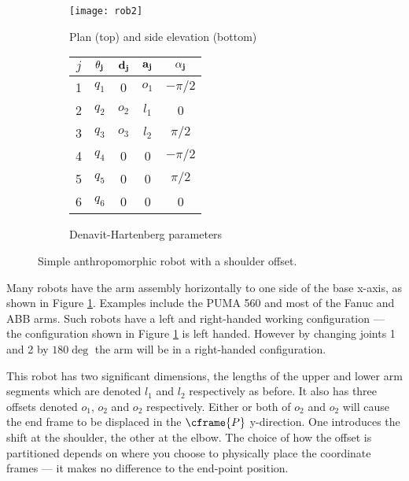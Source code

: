 \documentclass[11pt]{article}
\numberwithin{equation}{section}
\begin{document}
	\begin{figure}[h]
	\centering
	\begin{subfigure}[b]{0.6\textwidth}
		\texttt{[image: rob2]}
		\caption{Plan (top) and side elevation (bottom)}
		\label{fig:rob2}
	\end{subfigure}
	\begin{subfigure}[b]{0.3\textwidth}
		\begin{tabular}{|c|c|c|c|c|} \hline
			$j$ & $\bf \theta_j$ & $\bf d_j$ & $\bf a_j$ & $\bf \alpha_j$ \\ \hline
			\rowcolor{SkyBlue}1 &  $q_1$ & \cellcolor{White} 0 &  $o_1$& $-\pi/2$ \\
			\rowcolor{SkyBlue}2 & $q_2$ & $o_2$ & $l_1$& 0 \\
			\rowcolor{SkyBlue}3 &  $q_3$ & $o_3$ &$l_2$  & $\pi/2$ \\
			\rowcolor{Peach}4 & $q_4$ & 0 & 0 & $-\pi/2$ \\
			\rowcolor{Peach}5 &  $q_5$ & 0 & 0 & $\pi/2$ \\
			\cellcolor{Peach} 6 & \cellcolor{Peach} $q_6$ & 0 &0  & 0 \\ \hline
		\end{tabular}
		\caption{Denavit-Hartenberg parameters}
		\label{fig:dh2}
	\end{subfigure}
	\caption{Simple anthropomorphic robot with a shoulder offset.}
	\end{figure}


Many robots have the arm assembly horizontally to one side of the base x-axis, as shown in Figure \ref{fig:rob2}.  
Examples include the PUMA 560 and most of
the Fanuc and ABB arms.
Such robots have a left and right-handed working configuration\cite[Sec~7.4.4]{Corke11a} --- the configuration shown in Figure \ref{fig:rob2} is left handed.  However by
changing joints 1 and 2 by $180\deg$ the arm will be in a right-handed configuration.

This robot has two significant dimensions, the lengths of the upper and lower arm segments which are denoted $l_1$ and $l_2$ respectively as before.
It also has three offsets denoted $o_1$, $o_2$ and $o_2$ respectively.  
Either or both of $o_2$ and $o_2$ will cause the
end frame to be displaced in the $\cframe{P}$ y-direction.  One introduces the shift at the shoulder, the other at the elbow.
The choice of how the offset is partitioned depends on where you choose to physically place the coordinate frames --- it makes no difference to the end-point position.
\end{document}
